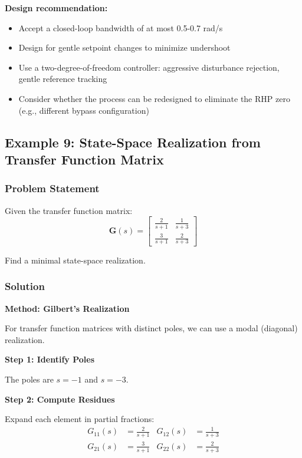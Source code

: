 \textbf{Design recommendation:}
\begin{itemize}
\item Accept a closed-loop bandwidth of at most 0.5-0.7 rad/s
\item Design for gentle setpoint changes to minimize undershoot
\item Use a two-degree-of-freedom controller: aggressive disturbance rejection, gentle reference tracking
\item Consider whether the process can be redesigned to eliminate the RHP zero (e.g., different bypass configuration)
\end{itemize}


\subsection{Example 9: State-Space Realization from Transfer Function Matrix}

\subsubsection{Problem Statement}

Given the transfer function matrix:
\begin{equation}
\mathbf{G}(s) = \begin{bmatrix} \frac{2}{s+1} & \frac{1}{s+3} \\[6pt] \frac{3}{s+1} & \frac{2}{s+3} \end{bmatrix}
\end{equation}

Find a minimal state-space realization.

\subsubsection{Solution}

\textbf{Method: Gilbert's Realization}

For transfer function matrices with distinct poles, we can use a modal (diagonal) realization.

\textbf{Step 1: Identify Poles}

The poles are $s = -1$ and $s = -3$.

\textbf{Step 2: Compute Residues}

Expand each element in partial fractions:
\begin{align}
G_{11}(s) &= \frac{2}{s+1} & G_{12}(s) &= \frac{1}{s+3} \\
G_{21}(s) &= \frac{3}{s+1} & G_{22}(s) &= \frac{2}{s+3}
\end{align}

